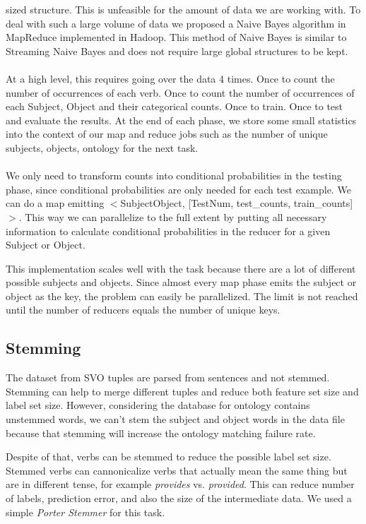 sized structure. This is unfeasible for the amount of data we are working with. To deal with such a large volume of data we proposed a Naive Bayes algorithm in MapReduce implemented in Hadoop. This method of Naive Bayes is similar to Streaming Naive Bayes and does not require large global structures to be kept.\\
\\
At a high level, this requires going over the data 4 times. Once to count the number of occurrences of each verb. Once to count the number of occurrences of each Subject, Object and their categorical counts. Once to train. Once to test and evaluate the results. At the end of each phase, we store some small statistics into the context of our map and reduce jobs such as the number of unique subjects, objects, ontology for the next task.\\
\\
We only need to transform counts into conditional probabilities in the testing phase, since conditional probabilities are only needed for each test example. We can do a map emitting $<$Subject\/Object, [TestNum, test\_counts, train\_counts]$>$. This way we can parallelize to the full extent by putting all necessary information to calculate conditional probabilities in the reducer for a given Subject or Object.

This implementation scales well with the task because there are a lot of different possible subjects and objects. Since almost every map phase emits the subject or object as the key, the problem can easily be parallelized. The limit is not reached until the number of reducers equals the number of unique keys.

\subsection{Stemming}

The dataset from SVO tuples are parsed from sentences and not stemmed. Stemming can help to merge different tuples and reduce both feature set size and label set size. However, considering the database for ontology contains unstemmed words, we can't stem the subject and object words in the data file because that stemming will increase the ontology matching failure rate.

Despite of that, verbs can be stemmed to reduce the possible label set size. Stemmed verbs can cannonicalize verbs that actually mean the same thing but are in different tense, for example \emph{provides} vs. \emph{provided}. This can reduce number of labels, prediction error, and also the size of the intermediate data. We used a simple \emph{Porter Stemmer} for this task.

